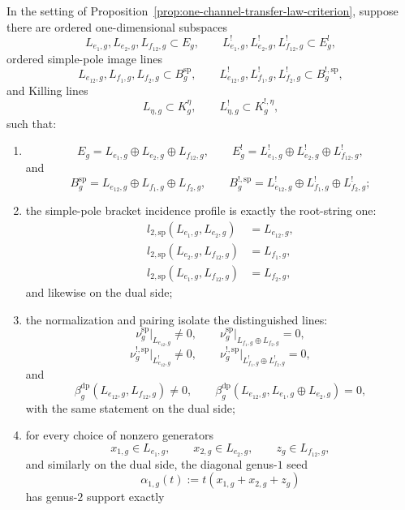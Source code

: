 \begin{proposition}\label{prop:one-channel-root-string-chart-criterion}
In the setting of
Proposition~\textup{\ref{prop:one-channel-transfer-law-criterion}},
suppose there are ordered one-dimensional subspaces
\[
L_{e_1,g},L_{e_2,g},L_{f_{12},g}\subset E_g,
\qquad
L_{e_1,g}^!,L_{e_2,g}^!,L_{f_{12},g}^!\subset E_g^!,
\]
ordered simple-pole image lines
\[
L_{e_{12},g},L_{f_1,g},L_{f_2,g}\subset B_g^{\mathrm{sp}},
\qquad
L_{e_{12},g}^!,L_{f_1,g}^!,L_{f_2,g}^!\subset B_g^{!,\mathrm{sp}},
\]
and Killing lines
\[
L_{\eta,g}\subset K_g^\eta,
\qquad
L_{\eta,g}^!\subset K_g^{!,\eta},
\]
such that:
\begin{enumerate}[label=\textup{(\roman*)}]
\item
  \[
  E_g=L_{e_1,g}\oplus L_{e_2,g}\oplus L_{f_{12},g},
  \qquad
  E_g^!=L_{e_1,g}^!\oplus L_{e_2,g}^!\oplus L_{f_{12},g}^!,
  \]
  and
  \[
  B_g^{\mathrm{sp}}
  =
  L_{e_{12},g}\oplus L_{f_1,g}\oplus L_{f_2,g},
  \qquad
  B_g^{!,\mathrm{sp}}
  =
  L_{e_{12},g}^!\oplus L_{f_1,g}^!\oplus L_{f_2,g}^!;
  \]
\item the simple-pole bracket incidence profile is exactly the
  root-string one:
  \[
  \begin{alignedat}{1}
  l_{2,\mathrm{sp}}(L_{e_1,g},L_{e_2,g})&=L_{e_{12},g},\\
  l_{2,\mathrm{sp}}(L_{e_2,g},L_{f_{12},g})&=L_{f_1,g},\\
  l_{2,\mathrm{sp}}(L_{e_1,g},L_{f_{12},g})&=L_{f_2,g},
  \end{alignedat}
  \]
  and likewise on the dual side;
\item the normalization and pairing isolate the distinguished lines:
  \[
  \nu_g^{\mathrm{sp}}\big|_{L_{e_{12},g}}\neq 0,
  \qquad
  \nu_g^{\mathrm{sp}}\big|_{L_{f_1,g}\oplus L_{f_2,g}}=0,
  \]
  \[
  \nu_g^{!,\mathrm{sp}}\big|_{L_{e_{12},g}^!}\neq 0,
  \qquad
  \nu_g^{!,\mathrm{sp}}\big|_{L_{f_1,g}^!\oplus L_{f_2,g}^!}=0,
  \]
  and
  \[
  \beta_g^{\mathrm{dp}}(L_{e_{12},g},L_{f_{12},g})\neq 0,
  \qquad
  \beta_g^{\mathrm{dp}}(L_{e_{12},g},L_{e_1,g}\oplus L_{e_2,g})=0,
  \]
  with the same statement on the dual side;
\item for every choice of nonzero generators
  \[
  x_{1,g}\in L_{e_1,g},
  \qquad
  x_{2,g}\in L_{e_2,g},
  \qquad
  z_g\in L_{f_{12},g},
  \]
  and similarly on the dual side, the diagonal genus-$1$ seed
  \[
  \alpha_{1,g}(t):=t(x_{1,g}+x_{2,g}+z_g)
  \]
  has genus-$2$ support exactly

\end{enumerate}
\end{proposition}
